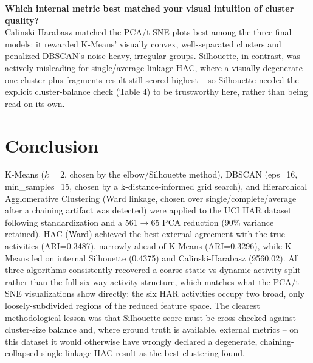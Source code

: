 \documentclass[11pt,a4paper]{article}
\begin{document}
\textbf{Which internal metric best matched your visual intuition of cluster quality?}\\
Calinski-Harabasz matched the PCA/t-SNE plots best among the three final models: it rewarded K-Means' visually convex, well-separated clusters and penalized DBSCAN's noise-heavy, irregular groups. Silhouette, in contrast, was actively misleading for single/average-linkage HAC, where a visually degenerate one-cluster-plus-fragments result still scored highest -- so Silhouette needed the explicit cluster-balance check (Table 4) to be trustworthy here, rather than being read on its own.

\section{Conclusion}
K-Means ($k=2$, chosen by the elbow/Silhouette method), DBSCAN (eps=16, min\_samples=15, chosen by a k-distance-informed grid search), and Hierarchical Agglomerative Clustering (Ward linkage, chosen over single/complete/average after a chaining artifact was detected) were applied to the UCI HAR dataset following standardization and a 561$\to$65 PCA reduction (90\% variance retained). HAC (Ward) achieved the best external agreement with the true activities (ARI=0.3487), narrowly ahead of K-Means (ARI=0.3296), while K-Means led on internal Silhouette (0.4375) and Calinski-Harabasz (9560.02). All three algorithms consistently recovered a coarse static-vs-dynamic activity split rather than the full six-way activity structure, which matches what the PCA/t-SNE visualizations show directly: the six HAR activities occupy two broad, only loosely-subdivided regions of the reduced feature space. The clearest methodological lesson was that Silhouette score must be cross-checked against cluster-size balance and, where ground truth is available, external metrics -- on this dataset it would otherwise have wrongly declared a degenerate, chaining-collapsed single-linkage HAC result as the best clustering found.

\end{document}
